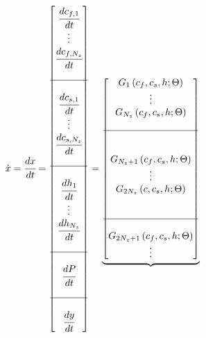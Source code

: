 \documentclass[../Article_Model_Parameters.tex]{subfiles}
\begin{document}
		{\footnotesize
			\begin{align*} \label{discretization}
				\dot{{\color{black}x}} &= \cfrac{d x}{d t} = 
				\begin{bmatrix}
					\cfrac{d {\color{black}c_{f,1}}}{d t} 	  \\
					\vdots					  \\
					\cfrac{d {\color{black}c_{f,N_z}}}{d t} \\
					\\ \hline \\
					\cfrac{d {\color{black}c_{s,1}}}{d t} 	  \\
					\vdots					  \\
					\cfrac{d {\color{black}c_{s,N_z}}}{d t} \\
					\\ \hline \\
					\cfrac{d {\color{black}h_1}}{d t} 	  \\
					\vdots 					  \\
					\cfrac{d {\color{black}h_{N_z}}}{d t} \\
					\\ \hline \\
					\cfrac{d P}{d t} \\
					\\ \hline \\
					\cfrac{d {\color{black}y}}{d t}
				\end{bmatrix}
				=
				\underbrace{\begin{bmatrix}
						{\color{black}G_1} \left( c_f,c_s,{\color{black}h}; \Theta \right)\\ 
						\vdots\\ 
						{\color{black}G_{N_z}} \left( c_f,c_s,{\color{black}h}; \Theta \right)\\ 
						\\ \hline \\ \\
						{\color{black}G_{N_z+1}} \left( c_f,c_s,{\color{black}h}; \Theta \right)\\ 
						\vdots\\
						{\color{black}G_{2N_z}} \left( {\color{black}c},c_s,{\color{black}h}; \Theta \right)\\ 
						\\ \\ \hline \\ 
						{\color{black}G_{2N_z+1}} \left( c_f,c_s,{\color{black}h}; \Theta \right) \\
						\vdots\\

\end{bmatrix}}
\end{align*}}
\end{document}

